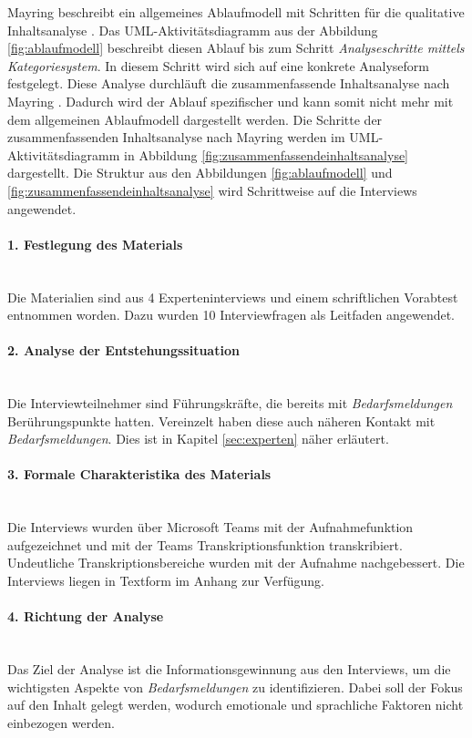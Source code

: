 Mayring beschreibt ein allgemeines Ablaufmodell mit Schritten für die qualitative Inhaltsanalyse \cite{mayring2019qualitative}. Das UML-Aktivitätsdiagramm aus der Abbildung \ref{fig:ablaufmodell} beschreibt diesen Ablauf bis zum Schritt \emph{Analyseschritte mittels Kategoriesystem}. In diesem Schritt wird sich auf eine konkrete Analyseform festgelegt. Diese Analyse durchläuft die zusammenfassende Inhaltsanalyse nach Mayring \cite{mayring2019qualitative}. Dadurch wird der Ablauf spezifischer und kann somit nicht mehr mit dem allgemeinen Ablaufmodell dargestellt werden. Die Schritte der zusammenfassenden Inhaltsanalyse nach Mayring werden im UML-Aktivitätsdiagramm in Abbildung \ref{fig:zusammenfassendeinhaltsanalyse} dargestellt. Die Struktur aus den Abbildungen \ref{fig:ablaufmodell} und \ref{fig:zusammenfassendeinhaltsanalyse} wird Schrittweise auf die Interviews angewendet.
\paragraph{1. Festlegung des Materials}\mbox{} \\
Die Materialien sind aus 4 Experteninterviews und einem schriftlichen Vorabtest entnommen worden. Dazu wurden 10 Interviewfragen als Leitfaden angewendet.
\paragraph{2. Analyse der Entstehungssituation}\mbox{} \\
Die Interviewteilnehmer sind Führungskräfte, die bereits mit \emph{Bedarfsmeldungen} Berührungspunkte hatten. Vereinzelt haben diese auch näheren Kontakt mit \emph{Bedarfsmeldungen}. Dies ist in Kapitel \ref{sec:experten} näher erläutert.
\paragraph{3. Formale Charakteristika des Materials}\mbox{} \\
Die Interviews wurden über Microsoft Teams mit der Aufnahmefunktion aufgezeichnet und mit der Teams Transkriptionsfunktion transkribiert. Undeutliche Transkriptionsbereiche wurden mit der Aufnahme nachgebessert. Die Interviews liegen in Textform im Anhang zur Verfügung.
\paragraph{4. Richtung der Analyse}\mbox{} \\
Das Ziel der Analyse ist die Informationsgewinnung aus den Interviews, um die wichtigsten Aspekte von \emph{Bedarfsmeldungen} zu identifizieren. Dabei soll der Fokus auf den Inhalt gelegt werden, wodurch emotionale und sprachliche Faktoren nicht einbezogen werden.

